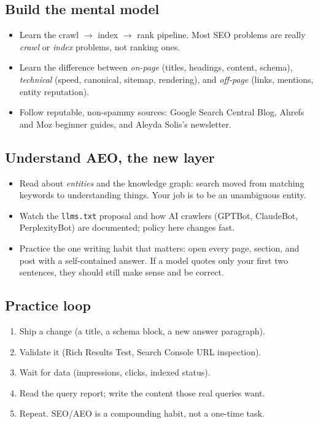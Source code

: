 \documentclass[11pt]{article}
\begin{document}
\subsection{Build the mental model}
\begin{itemize}[leftmargin=1.4em]
  \item Learn the crawl $\rightarrow$ index $\rightarrow$ rank pipeline. Most
  SEO problems are really \emph{crawl} or \emph{index} problems, not ranking
  ones.
  \item Learn the difference between \emph{on-page} (titles, headings, content,
  schema), \emph{technical} (speed, canonical, sitemap, rendering), and
  \emph{off-page} (links, mentions, entity reputation).
  \item Follow reputable, non-spammy sources: Google Search Central Blog,
  Ahrefs and Moz beginner guides, and Aleyda Solis's newsletter.
\end{itemize}

\subsection{Understand AEO, the new layer}
\begin{itemize}[leftmargin=1.4em]
  \item Read about \emph{entities} and the knowledge graph: search moved from
  matching keywords to understanding things. Your job is to be an
  unambiguous entity.
  \item Watch the \texttt{llms.txt} proposal and how AI crawlers
  (GPTBot, ClaudeBot, PerplexityBot) are documented; policy here changes fast.
  \item Practice the one writing habit that matters: open every page, section,
  and post with a self-contained answer. If a model quotes only your first two
  sentences, they should still make sense and be correct.
\end{itemize}

\subsection{Practice loop}
\begin{enumerate}[leftmargin=1.6em]
  \item Ship a change (a title, a schema block, a new answer paragraph).
  \item Validate it (Rich Results Test, Search Console URL inspection).
  \item Wait for data (impressions, clicks, indexed status).
  \item Read the query report; write the content those real queries want.
  \item Repeat. SEO/AEO is a compounding habit, not a one-time task.
\end{enumerate}
\end{document}
